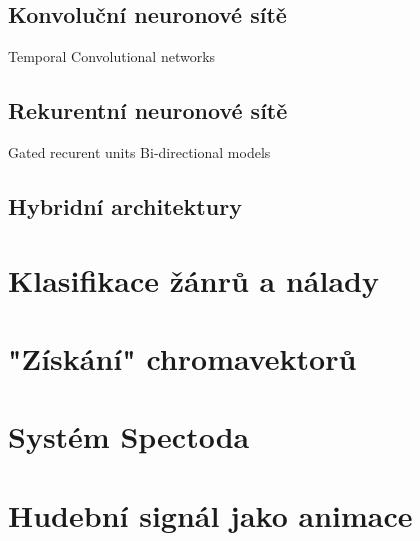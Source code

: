   \subsection{Konvoluční neuronové sítě}
    Temporal Convolutional networks

  \subsection{Rekurentní neuronové sítě}
    Gated recurent units
    Bi-directional models

  \subsection{Hybridní architektury}

\section{Klasifikace žánrů a nálady} \label{sec:Klasifikace_zanru}

\section{"Získání" chromavektorů} \label{sec:Chroma_vektory}

\section{Systém Spectoda} \label{sec:Spectoda}

\section{Hudební signál jako animace}
